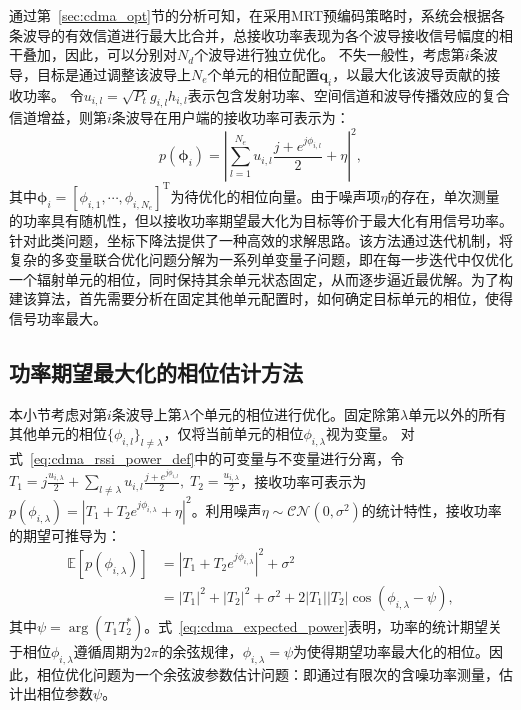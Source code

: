 通过第~\ref{sec:cdma_opt}节的分析可知，在采用MRT预编码策略时，系统会根据各条波导的有效信道进行最大比合并，总接收功率表现为各个波导接收信号幅度的相干叠加，因此，可以分别对$N_d$个波导进行独立优化。
不失一般性，考虑第$i$条波导，目标是通过调整该波导上$N_e$个单元的相位配置$\bm q_i$，以最大化该波导贡献的接收功率。
令$u_{i,l} = \sqrt{P_t} g_{i,l} h_{i,l}$表示包含发射功率、空间信道和波导传播效应的复合信道增益，则第$i$条波导在用户端的接收功率可表示为：
\begin{equation}\label{eq:cdma_rssi_power_def}
	p(\bm{\phi}_i) = \left| \sum_{l=1}^{N_e} u_{i,l} \frac{j+e^{j\phi_{i,l}}}{2} + \eta \right|^2,
\end{equation}
其中$\bm{\phi}_i = [\phi_{i,1}, \cdots, \phi_{i,N_e}]^\mathrm{T}$为待优化的相位向量。由于噪声项$\eta$的存在，单次测量的功率具有随机性，但以接收功率期望最大化为目标等价于最大化有用信号功率。针对此类问题，坐标下降法提供了一种高效的求解思路。该方法通过迭代机制，将复杂的多变量联合优化问题分解为一系列单变量子问题，即在每一步迭代中仅优化一个辐射单元的相位，同时保持其余单元状态固定，从而逐步逼近最优解。为了构建该算法，首先需要分析在固定其他单元配置时，如何确定目标单元的相位，使得信号功率最大。

\subsection{功率期望最大化的相位估计方法}\label{sec:cdma_phase_est_method}

本小节考虑对第$i$条波导上第$\lambda$个单元的相位进行优化。固定除第$\lambda$单元以外的所有其他单元的相位$\{\phi_{i,l}\}_{l \neq \lambda}$，仅将当前单元的相位$\phi_{i,\lambda}$视为变量。
对式~\eqref{eq:cdma_rssi_power_def}中的可变量与不变量进行分离，令$T_1 =j\frac{u_{i,\lambda}}{2} + \sum_{l\neq \lambda} u_{i,l} \frac{j+e^{j\phi_{i,l}}}{2}, \; T_2=\frac{u_{i,\lambda}}{2}$，接收功率可表示为$p(\phi_{i,\lambda})=\left| T_1+T_2 e^{j\phi_{i,\lambda}}+\eta \right|^2 $。利用噪声$\eta \sim \mathcal{CN}(0, \sigma^2)$的统计特性，接收功率的期望可推导为：
\begin{align}
	\mathbb{E}[p(\phi_{i,\lambda})] &= |T_1 + T_2 e^{j\phi_{i,\lambda}}|^2 + \sigma^2 \\
	&=|T_1|^2 + |T_2|^2 + \sigma^2 +  2|T_1||T_2| \cos(\phi_{i,\lambda} - \psi),\label{eq:cdma_expected_power}
\end{align}
其中$\psi = \arg(T_1 T_2^*)$。式~\eqref{eq:cdma_expected_power}表明，功率的统计期望关于相位$\phi_{i,\lambda}$遵循周期为$2\pi$的余弦规律，$\phi_{i,\lambda}=\psi$为使得期望功率最大化的相位。因此，相位优化问题为一个余弦波参数估计问题：即通过有限次的含噪功率测量，估计出相位参数$\psi$。


